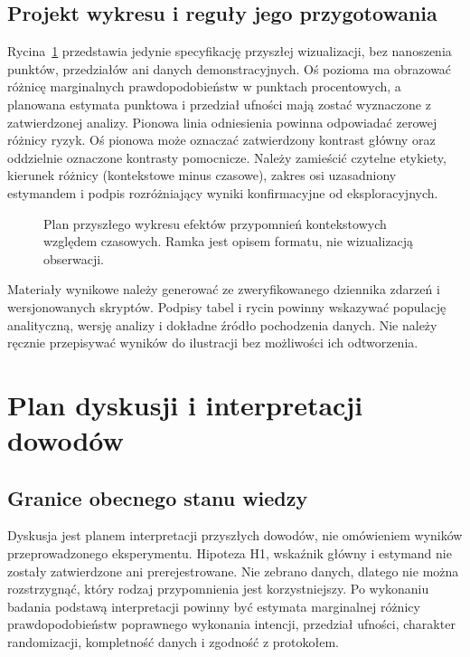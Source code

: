 \documentclass[11pt,a4paper]{article}
\begin{document}
\subsection{Projekt wykresu i reguły jego przygotowania}
Rycina~\ref{fig:effect-plan} przedstawia jedynie specyfikację przyszłej wizualizacji, bez nanoszenia punktów, przedziałów ani danych demonstracyjnych. Oś pozioma ma obrazować różnicę marginalnych prawdopodobieństw w punktach procentowych, a planowana estymata punktowa i przedział ufności mają zostać wyznaczone z zatwierdzonej analizy. Pionowa linia odniesienia powinna odpowiadać zerowej różnicy ryzyk. Oś pionowa może oznaczać zatwierdzony kontrast główny oraz oddzielnie oznaczone kontrasty pomocnicze. Należy zamieścić czytelne etykiety, kierunek różnicy (kontekstowe minus czasowe), zakres osi uzasadniony estymandem i podpis rozróżniający wyniki konfirmacyjne od eksploracyjnych.

\begin{figure}[htbp]
\centering
{}
\caption{Plan przyszłego wykresu efektów przypomnień kontekstowych względem czasowych. Ramka jest opisem formatu, nie wizualizacją obserwacji.}
\label{fig:effect-plan}
\end{figure}

Materiały wynikowe należy generować ze zweryfikowanego dziennika zdarzeń i wersjonowanych skryptów. Podpisy tabel i rycin powinny wskazywać populację analityczną, wersję analizy i dokładne źródło pochodzenia danych. Nie należy ręcznie przepisywać wyników do ilustracji bez możliwości ich odtworzenia.

\section{Plan dyskusji i interpretacji dowodów}
\subsection{Granice obecnego stanu wiedzy}
Dyskusja jest planem interpretacji przyszłych dowodów, nie omówieniem wyników przeprowadzonego eksperymentu. Hipoteza H1, wskaźnik główny i estymand nie zostały zatwierdzone ani prerejestrowane. Nie zebrano danych, dlatego nie można rozstrzygnąć, który rodzaj przypomnienia jest korzystniejszy. Po wykonaniu badania podstawą interpretacji powinny być estymata marginalnej różnicy prawdopodobieństw poprawnego wykonania intencji, przedział ufności, charakter randomizacji, kompletność danych i zgodność z protokołem.
\end{document}
